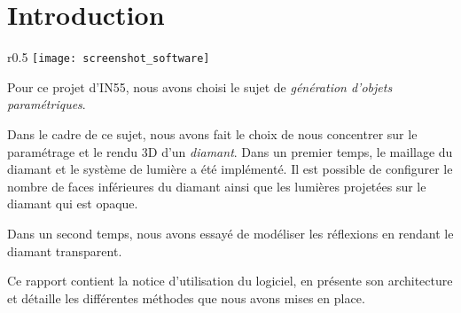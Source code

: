 \section{Introduction}

\begin{wrapfigure}{r}{0.5\textwidth}
    \centering
    \texttt{[image: screenshot\_software]}
\end{wrapfigure}

Pour ce projet d'IN55, nous avons choisi le sujet de \emph{génération d'objets paramétriques}.

Dans le cadre de ce sujet, nous avons fait le choix de nous concentrer sur le paramétrage
et le rendu 3D d'un \emph{diamant}.
Dans un premier temps, le maillage du diamant et le système de lumière a été implémenté.
Il est possible de configurer le nombre de faces inférieures du diamant ainsi que
les lumières projetées sur le diamant qui est opaque.

Dans un second temps, nous avons essayé de modéliser les réflexions en rendant le diamant
transparent.

Ce rapport contient la notice d'utilisation du logiciel, en présente son architecture
et détaille les différentes méthodes que nous avons mises en place.

